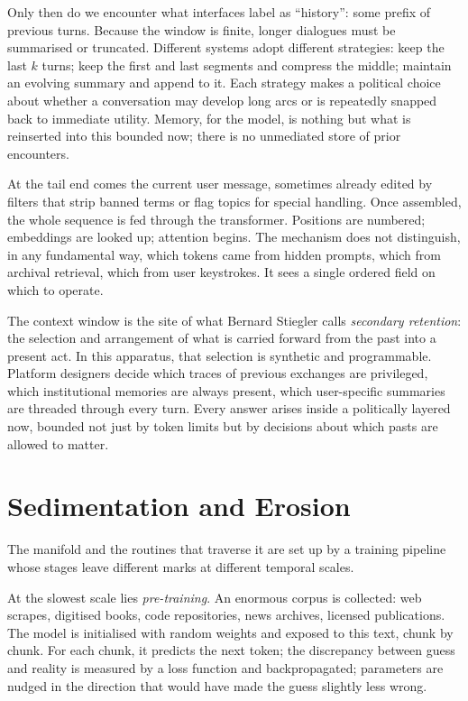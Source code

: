 \documentclass[12pt,a4paper]{article}
\begin{document}
Only then do we encounter what interfaces label as ``history'': some prefix of previous turns. Because the window is finite, longer dialogues must be summarised or truncated. Different systems adopt different strategies: keep the last $k$ turns; keep the first and last segments and compress the middle; maintain an evolving summary and append to it. Each strategy makes a political choice about whether a conversation may develop long arcs or is repeatedly snapped back to immediate utility. Memory, for the model, is nothing but what is reinserted into this bounded now; there is no unmediated store of prior encounters.

At the tail end comes the current user message, sometimes already edited by filters that strip banned terms or flag topics for special handling. Once assembled, the whole sequence is fed through the transformer. Positions are numbered; embeddings are looked up; attention begins. The mechanism does not distinguish, in any fundamental way, which tokens came from hidden prompts, which from archival retrieval, which from user keystrokes. It sees a single ordered field on which to operate.

The context window is the site of what Bernard Stiegler calls \emph{secondary retention}: the selection and arrangement of what is carried forward from the past into a present act. In this apparatus, that selection is synthetic and programmable. Platform designers decide which traces of previous exchanges are privileged, which institutional memories are always present, which user-specific summaries are threaded through every turn. Every answer arises inside a politically layered now, bounded not just by token limits but by decisions about which pasts are allowed to matter.

\section{Sedimentation and Erosion}

The manifold and the routines that traverse it are set up by a training pipeline whose stages leave different marks at different temporal scales.

At the slowest scale lies \emph{pre-training}. An enormous corpus is collected: web scrapes, digitised books, code repositories, news archives, licensed publications. The model is initialised with random weights and exposed to this text, chunk by chunk. For each chunk, it predicts the next token; the discrepancy between guess and reality is measured by a loss function and backpropagated; parameters are nudged in the direction that would have made the guess slightly less wrong.
\end{document}

